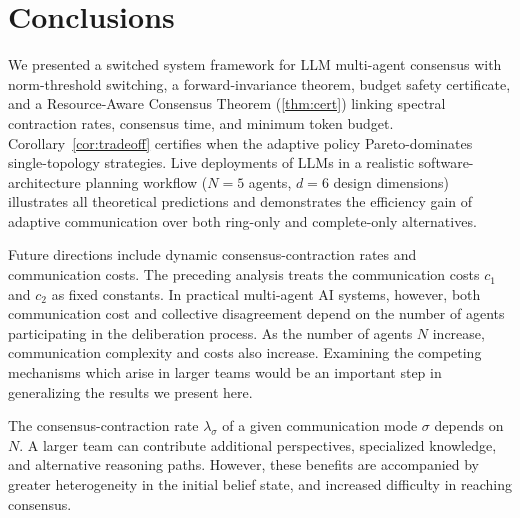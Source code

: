 \documentclass[journal,twoside,web]{ieeecolor_no_firstpage_logo}
\begin{document}

\section{Conclusions}\label{sec:conclusion}

We presented a switched system framework for LLM multi-agent
consensus with norm-threshold switching, a forward-invariance theorem, budget safety certificate, and a Resource-Aware Consensus
Theorem (\ref{thm:cert}) linking spectral contraction rates, consensus time, and minimum
token budget.
Corollary~\ref{cor:tradeoff} certifies when the adaptive policy
Pareto-dominates single-topology strategies.
Live deployments of LLMs in a realistic software-architecture planning workflow
($N=5$ agents, $d=6$ design dimensions) illustrates all theoretical
predictions and demonstrates the efficiency gain of adaptive
communication over both ring-only and complete-only alternatives.

Future directions include dynamic consensus-contraction rates and communication costs. The preceding analysis treats the communication costs
$c_1$ and $c_2$ as fixed constants. In practical multi-agent AI systems, however, both communication cost and collective disagreement depend on the number of agents participating in the deliberation process. As the number of agents $N$ increase, communication complexity and costs also increase. Examining the competing mechanisms which arise in larger teams would be an important step in generalizing the results we present here. %

The consensus-contraction rate $\lambda_\sigma$ of a given communication mode $\sigma$ depends on $N$. A larger team can contribute additional perspectives, specialized knowledge, and alternative reasoning paths. However, these benefits are accompanied by greater heterogeneity in the initial belief state, and increased difficulty in reaching consensus. %
\end{document}
